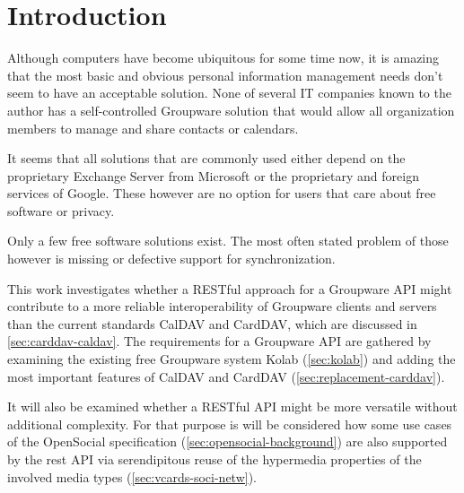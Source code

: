 \documentclass[11pt,a4paper,headsepline,twoside]{scrartcl}		%
\begin{document}
\tableofcontents{}
\newpage{}

\section{Introduction}
\label{sec:introduction}



Although computers have become ubiquitous for some time now, it is amazing that the
most basic and obvious personal information management needs don't seem to have
an acceptable solution. None of several IT companies known to the author has a
self-controlled Groupware solution that would allow all organization members to
manage and share contacts or calendars.

It seems that all solutions that are commonly used either depend on the
proprietary Exchange Server from Microsoft or the proprietary and foreign
services of Google. These however are no option for users that care about free
software or privacy.

Only a few free software solutions exist. The most often stated problem of those
however is missing or defective support for synchronization.

This work investigates whether a RESTful approach for a Groupware API might
contribute to a more reliable interoperability of Groupware clients and servers
than the current standards CalDAV and CardDAV, which are discussed in
\autoref{sec:carddav-caldav}. The requirements for a Groupware API are gathered
by examining the existing free Groupware system Kolab (\autoref{sec:kolab}) and
adding the most important features of CalDAV and CardDAV
(\autoref{sec:replacement-carddav}).

It will also be examined whether a RESTful API might be more versatile without
additional complexity. For that purpose is will be considered how some use
cases of the OpenSocial specification (\autoref{sec:opensocial-background}) are
also supported by the rest API via serendipitous reuse of the hypermedia
properties of the involved media types (\autoref{sec:vcards-soci-netw}).
\end{document}
